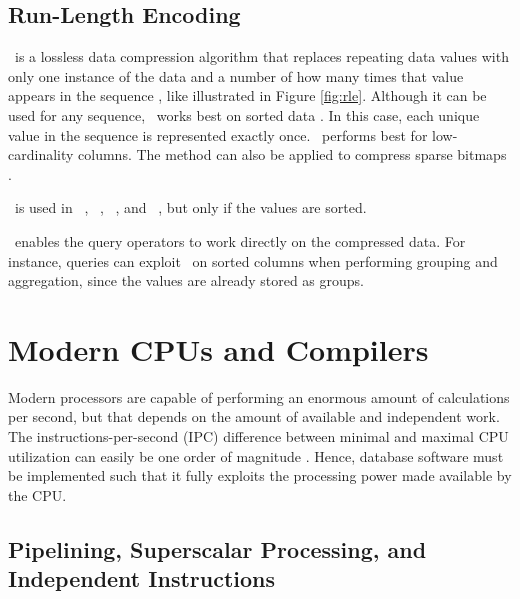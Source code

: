 \subsection{Run-Length Encoding}
\label{sub:Run-Length Encoding}

\rle~is a lossless data compression algorithm that replaces repeating data values with only one instance of the data and a number of how many times that value appears in the sequence \cite{Stoimen_undated-js}, like illustrated in Figure \ref{fig:rle}. Although it can be used for any sequence, \rle~works best on sorted data \cite{Bjorklund2011-wh, Holloway2008-rr}. In this case, each unique value in the sequence is represented exactly once. \rle~performs best for low-cardinality columns. The method can also be applied to compress sparse bitmaps \cite{Stonebraker2005-qz}.

\rle~is used in \cstore~\cite{Stonebraker2005-qz}, \vertica~\cite{Lamb2012-kg}, \oracle~\cite{Oracle2015-fs}, and \sapnw~\cite{Lemke2010-is}, but only if the values are sorted. 

\rle~enables the query operators to work directly on the compressed data. For instance, queries can exploit \rle~on sorted columns when performing grouping and aggregation, since the values are already stored as groups. 


\section{Modern CPUs and Compilers}
\label{sec:Modern CPUs and Compilers}
Modern processors are capable of performing an enormous amount of calculations per second, but that depends on the amount of available and independent work. The instructions-per-second (IPC) difference between minimal and maximal CPU utilization can easily be one order of magnitude \cite{Boncz2005-wj}. Hence, database software must be implemented such that it fully exploits the processing power made available by the CPU.

\subsection{Pipelining, Superscalar Processing, and Independent Instructions}
\label{sub:Pipelining, Superscalar Processing, and Independent Instructions}

